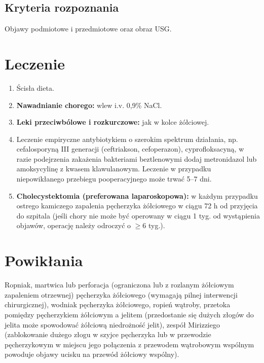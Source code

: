 \subsection{Kryteria rozpoznania}

Objawy podmiotowe i przedmiotowe oraz obraz USG.


\section{Leczenie}

\begin{enumerate}
    \item Ścisła dieta.

    \item \textbf{Nawadnianie chorego:} wlew i.v. 0,9\% NaCl.

    \item \textbf{Leki przeciwbólowe i rozkurczowe:} jak w kolce żółciowej.

    \item Leczenie empiryczne antybiotykiem o szerokim spektrum działania, np. cefalosporyną III generacji (ceftriakson, cefoperazon), cyprofloksacyną, w razie podejrzenia zakażenia bakteriami beztlenowymi dodaj metronidazol lub amoksycylinę z kwasem klawulanowym. 
    Leczenie w przypadku niepowikłanego przebiegu pooperacyjnego może trwać 5–7 dni.

    \item \textbf{Cholecystektomia (preferowana laparoskopowa):} w każdym przypadku ostrego kamiczego zapalenia pęcherzyka żółciowego w ciągu 72 h od przyjęcia do szpitala (jeśli chory nie może być operowany w ciągu 1 tyg. od wystąpienia objawów, operację należy odroczyć o $\geq$6 tyg.).
\end{enumerate}

\section{Powikłania}

Ropniak, martwica lub perforacja (ograniczona lub z rozlanym żółciowym zapaleniem otrzewnej) pęcherzyka żółciowego (wymagają pilnej interwencji chirurgicznej), wodniak pęcherzyka żółciowego, ropień wątroby, przetoka pomiędzy pęcherzykiem żółciowym a jelitem (przedostanie się dużych złogów do jelita może spowodować żółciową niedrożność jelit), zespół Mirizziego (zablokowanie dużego złogu w szyjce pęcherzyka lub w przewodzie pęcherzykowym w miejscu jego połączenia z przewodem wątrobowym wspólnym powoduje objawy ucisku na przewód żółciowy wspólny).